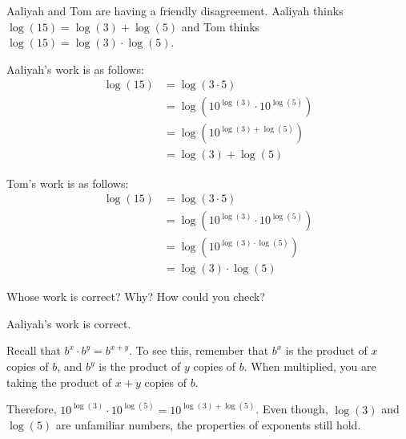 \documentclass[noauthor]{ximera}
\begin{document}
\begin{problem}
Aaliyah and Tom are having a friendly disagreement. Aaliyah thinks
\(\log(15) = \log(3) + \log(5)\) and Tom thinks
\(\log(15) = \log(3) \cdot \log(5)\).
 
Aaliyah's work is as follows:
    \begin{align*}
        \log(15) & = \log(3 \cdot 5) \\
        & = \log(10^{\log(3)} \cdot 10^{\log(5)}) \\
        & = \log(10^{\log(3) + \log(5)}) \\
        & = \log(3) + \log(5)
    \end{align*}
 
Tom's work is as follows:
    \begin{align*}
        \log(15) & = \log(3 \cdot 5) \\
        & = \log(10^{\log(3)} \cdot 10^{\log(5)}) \\
        & = \log(10^{\log(3) \cdot \log(5)}) \\
        & = \log(3) \cdot \log(5)
    \end{align*}
 
 
Whose work is correct? Why? How could you check?

\begin{explanation}
    Aaliyah's work is correct. 
    
    Recall that \(b^{x}\cdot b^y = b^{x + y}\). To see this, remember that
    \(b^x\) is the product of \(x\) copies of \(b\), and \(b^y\) is the product of \(y\) copies of \(b\).
    When multiplied, you are taking the product of \(x + y\) copies of \(b\).

    Therefore, \(10^{\log(3)} \cdot 10^{\log(5)} = 10^{\log(3) + \log(5)}\). Even though, \(\log(3)\) and \(\log(5)\) are unfamiliar
    numbers, the properties of exponents still hold. 
\end{explanation}
\end{problem}
 
\end{document}
